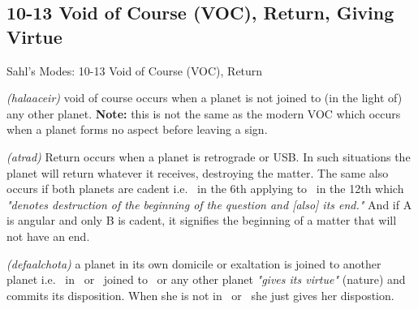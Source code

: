 \subsection{10-13 Void of Course (VOC), Return, Giving Virtue}
\begin{frame}[t]{Sahl's Modes: 10-13 Void of Course (VOC), Return}
\begin{description}[style=nextline]
\item[10. Void of Course] \textsl{(halaaceir)} void of course occurs when a planet is not joined to (in the light of) any other planet. \textbf{Note:} this is not the same as the modern VOC  which occurs when a planet forms no aspect before leaving a sign.

\item[11. Return] \textsl{(atrad)} Return occurs when a planet is retrograde or USB. In such situations the planet will return whatever it receives, destroying the matter. The same also occurs if both planets are cadent i.e. \Moon\ in the 6th applying to \Mars\ in the 12th which \textsl{"denotes destruction of the beginning of the question and [also] its end."} And if A is angular and only B is cadent, it signifies the beginning of a matter that will not have an end.

\item[12-13. Giving Virtue and Nature] \textsl{(defaalchota)} a planet in its own domicile or exaltation is joined to another planet i.e. \Moon\ in \Cancer\ or \Taurus\ joined to \Jupiter\ or any other planet \textsl{"gives its virtue"} (nature) and commits its disposition. When she is not in \Taurus\ or \Cancer\ she just gives her dispostion.\footnotemark[1]
\end{description}
\end{frame}
